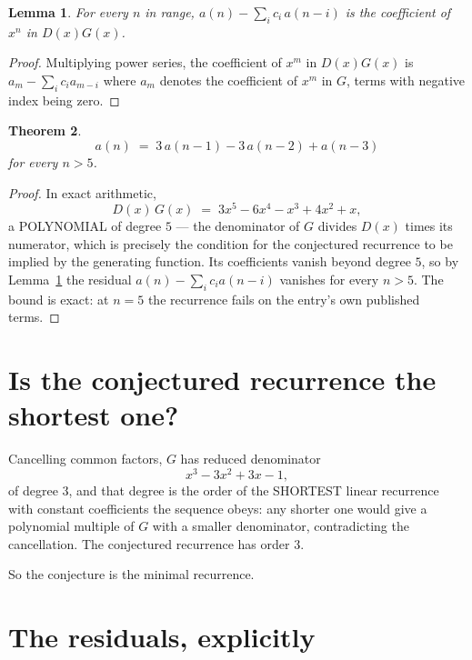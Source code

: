 \documentclass[11pt,a4paper]{article}
\theoremstyle{plain}
\newtheorem{theorem}{Theorem}
\newtheorem{lemma}[theorem]{Lemma}
\theoremstyle{definition}
\begin{document}
\begin{lemma}\label{lem:key}
For every $n$ in range, $a(n)-\sum_i c_i\,a(n-i)$ is the coefficient of $x^{n}$ in
$D(x)G(x)$.
\end{lemma}

\begin{proof}
Multiplying power series, the coefficient of $x^{m}$ in $D(x)G(x)$ is
$a_m-\sum_i c_i a_{m-i}$ where $a_m$ denotes the coefficient of $x^{m}$ in $G$, terms with
negative index being zero.
\end{proof}

\begin{theorem}
\[
a(n)\;=\;3\,a(n-1) - 3\,a(n-2) + a(n-3)
\]
for every $n>5$.
\end{theorem}

\begin{proof}
In exact arithmetic,
\[
D(x)\,G(x)\;=\;3 x^{5} - 6 x^{4} - x^{3} + 4 x^{2} + x,
\]
a POLYNOMIAL of degree $5$ --- the denominator of $G$ divides $D(x)$ times its numerator,
which is precisely the condition for the conjectured recurrence to be implied by the
generating function. Its coefficients vanish beyond degree $5$, so by
Lemma~\ref{lem:key} the residual $a(n)-\sum_ic_ia(n-i)$ vanishes for every
$n>5$. The bound is exact: at $n=5$ the recurrence fails on the entry's own published terms.
\end{proof}

\section{Is the conjectured recurrence the shortest one?}

Cancelling common factors, $G$ has reduced denominator
\[
x^{3} - 3 x^{2} + 3 x - 1,
\]
of degree $3$, and that degree is the order of the SHORTEST linear recurrence with
constant coefficients the sequence obeys: any shorter one would give a polynomial multiple of
$G$ with a smaller denominator, contradicting the cancellation. The conjectured recurrence has
order $3$.

So the conjecture is the minimal recurrence.

\section{The residuals, explicitly}
\end{document}
